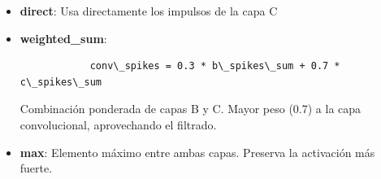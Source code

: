 



\begin{itemize}
    \item \textbf{direct}: Usa directamente los impulsos de la capa C
        
        
    \item \textbf{weighted\_sum}:
        \begin{lstlisting}
            conv\_spikes = 0.3 * b\_spikes\_sum + 0.7 * c\_spikes\_sum
        \end{lstlisting}
        
        Combinación ponderada de capas B y C. Mayor peso (0.7) a la capa convolucional, aprovechando el filtrado.
    \item \textbf{max}: Elemento máximo entre ambas capas. Preserva la activación más fuerte.
        
        
\end{itemize}





